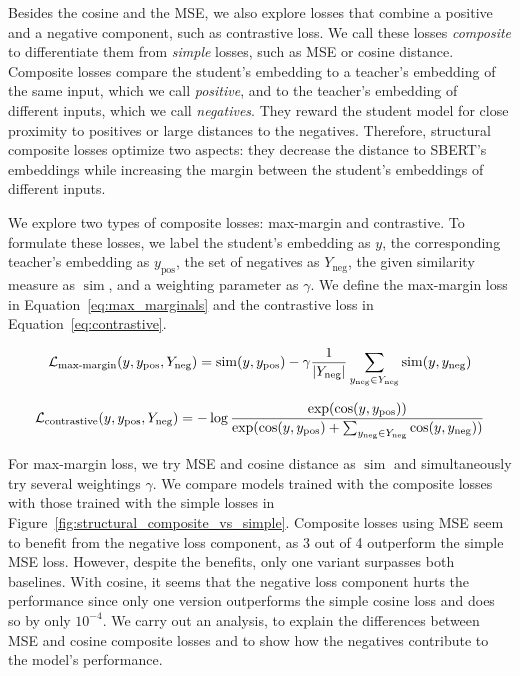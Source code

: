 Besides the cosine and the MSE, we also explore losses that combine a positive
and a negative component, such as contrastive loss. We call these losses
\emph{composite} to differentiate them from \emph{simple} losses, such as MSE or cosine
distance. Composite losses compare the student's embedding to a teacher's
embedding of the same input, which we call \emph{positive}, and to
the teacher's embedding of different inputs, which we call
\emph{negatives}. They reward the student model for close proximity to
positives or large distances to the negatives. Therefore, structural composite
losses optimize two aspects: they decrease the distance to SBERT's embeddings
while increasing the margin between the student's embeddings of different inputs.

We explore two types of composite losses: max-margin and contrastive. To
formulate these losses, we label the student's embedding as $y$, the
corresponding teacher's embedding as $y_{\text{pos}}$, the set of negatives as
$Y_{\text{neg}}$, the given similarity measure as $\operatorname{sim}$, and a
weighting parameter as $\gamma$. We define the max-margin loss in
Equation~\ref{eq:max_marginals} and the contrastive loss in
Equation~\ref{eq:contrastive}.

\begin{equation}
  \mathcal{L}_{\text{max-margin}}(y, y_\text{pos}, Y_\text{neg}) =
    \operatorname{sim}(y, y_\text{pos}) -
    \gamma \frac{1}{|Y_\text{neg}|} \sum_{y_\text{neg} \in Y_\text{neg}}
      \operatorname{sim}(y, y_\text{neg})
  \label{eq:max_marginals}
\end{equation}

\begin{equation}
  \mathcal{L}_{\text{contrastive}}(y, y_\text{pos}, Y_\text{neg}) =
    -\log \frac{
      \exp(\cos(y, y_\text{pos}))
    }{
      \exp(
        \cos(y, y_\text{pos}) +
        \sum_{y_\text{neg} \in Y_\text{neg}} \cos(y, y_\text{neg})
      )
    }
  \label{eq:contrastive}
\end{equation}

For max-margin loss, we try MSE and cosine distance as $\operatorname{sim}$ and
simultaneously try several weightings $\gamma$. We compare models trained with
the composite losses with those trained with the simple losses in
Figure~\ref{fig:structural_composite_vs_simple}. Composite losses using MSE
seem to benefit from the negative loss component, as 3 out of 4 outperform the
simple MSE loss. However, despite the benefits, only one variant surpasses both
baselines. With cosine, it seems that the negative loss component hurts the
performance since only one version outperforms the simple cosine loss and does
so by only $10^{-4}$. We carry out an analysis, to explain the differences
between MSE and cosine composite losses and to show how the negatives
contribute to the model's performance.

